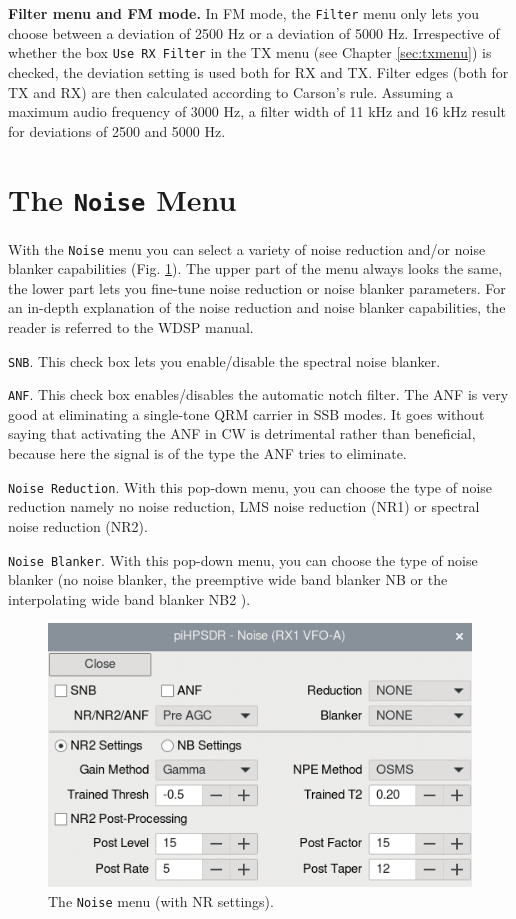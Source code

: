 \documentclass[12pt]{book}
\def\rett#1{\texttt{\color{red}#1}}
\def\bltt#1{\texttt{\color{blue}#1}}
\begin{document}
\textbf{Filter menu and FM mode.} In FM mode, the \bltt{Filter} menu only lets you
choose between a deviation of 2500 Hz or a deviation of 5000 Hz.
Irrespective of whether the box \rett{Use RX Filter} in the TX menu (see
Chapter \ref{sec:txmenu}) is checked, the deviation setting is used both for RX and TX.
Filter edges (both for
TX and RX) are then calculated according to Carson's rule. Assuming a maximum audio
frequency of 3000 Hz, a filter width of 11 kHz and 16 kHz result for deviations of 2500
and 5000 Hz.

\section{The \texttt{Noise} Menu}



With the \bltt{Noise} menu you can select a variety of noise reduction and/or
noise blanker capabilities (Fig. \ref{fig:NoiseMenu1}). The upper part of the
menu always looks the same, the lower part lets you fine-tune noise reduction
or noise blanker parameters. For an in-depth explanation of the noise reduction
and noise blanker capabilities, the reader is referred to the WDSP manual.

\rett{SNB}. This check box lets you enable/disable the spectral noise blanker.

\rett{ANF}. This check box enables/disables the automatic notch filter. The ANF is
very good at eliminating a single-tone QRM carrier in SSB modes. It goes without
saying that activating the ANF in CW is detrimental rather than beneficial, because
here the signal is of the type the ANF tries to eliminate.

\rett{Noise Reduction}. With this pop-down menu, you can choose the type of noise reduction
namely no noise reduction, LMS noise reduction (NR1) or spectral noise reduction (NR2).

\rett{Noise Blanker}. With this pop-down menu, you can choose the type of noise blanker
(no noise blanker, the preemptive wide band blanker NB or the interpolating wide band
blanker NB2 ).

\begin{figure}[ht]
\center
\includegraphics[scale=0.45]{NoiseMenu1.png}
\caption{The \bltt{Noise} menu (with NR settings).}
\label{fig:NoiseMenu1}
\end{figure}
\end{document}
